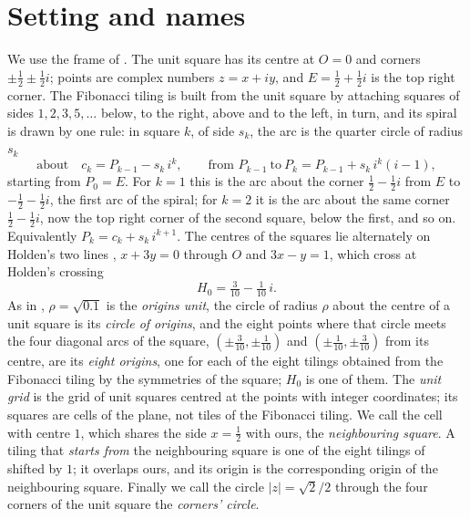 \documentclass[11pt,a4paper]{article}
\theoremstyle{plain}
\theoremstyle{definition}
\theoremstyle{remark}
\begin{document}
\section{Setting and names}

We use the frame of \cite{origins}. The unit square has its centre at $O=0$ and corners $\pm\tfrac12\pm\tfrac12 i$; points are complex numbers $z=x+iy$, and $E=\tfrac12+\tfrac12 i$ is the top right corner. The Fibonacci tiling is built from the unit square by attaching squares of sides $1,2,3,5,\dots$ below, to the right, above and to the left, in turn, and its spiral is drawn by one rule: in square $k$, of side $s_k$, the arc is the quarter circle of radius $s_k$
\begin{equation}\label{eq:rule}
  \text{about}\quad c_k = P_{k-1} - s_k\, i^{k},\qquad\text{from } P_{k-1}\ \text{to}\ P_k = P_{k-1} + s_k\, i^{k}(i-1),
\end{equation}
starting from $P_0=E$. For $k=1$ this is the arc about the corner $\tfrac12-\tfrac12 i$ from $E$ to $-\tfrac12-\tfrac12 i$, the first arc of the spiral; for $k=2$ it is the arc about the same corner $\tfrac12-\tfrac12i$, now the top right corner of the second square, below the first, and so on. Equivalently $P_k=c_k+s_k\,i^{k+1}$. The centres of the squares lie alternately on Holden's two lines \cite{holden,gardiner}, $x+3y=0$ through $O$ and $3x-y=1$, which cross at Holden's crossing
\[
  H_0=\tfrac3{10}-\tfrac1{10}\,i .
\]
As in \cite{origins}, $\rho=\sqrt{0.1}$ is the \emph{origins unit}, the circle of radius $\rho$ about the centre of a unit square is its \emph{circle of origins}, and the eight points where that circle meets the four diagonal arcs of the square, $(\pm\tfrac3{10},\pm\tfrac1{10})$ and $(\pm\tfrac1{10},\pm\tfrac3{10})$ from its centre, are its \emph{eight origins}, one for each of the eight tilings obtained from the Fibonacci tiling by the symmetries of the square; $H_0$ is one of them. The \emph{unit grid} is the grid of unit squares centred at the points with integer coordinates; its squares are cells of the plane, not tiles of the Fibonacci tiling. We call the cell with centre $1$, which shares the side $x=\tfrac12$ with ours, the \emph{neighbouring square}. A tiling that \emph{starts from} the neighbouring square is one of the eight tilings of \cite{origins} shifted by $1$; it overlaps ours, and its origin is the corresponding origin of the neighbouring square. Finally we call the circle $|z|=\sqrt2/2$ through the four corners of the unit square the \emph{corners' circle}.
\end{document}
